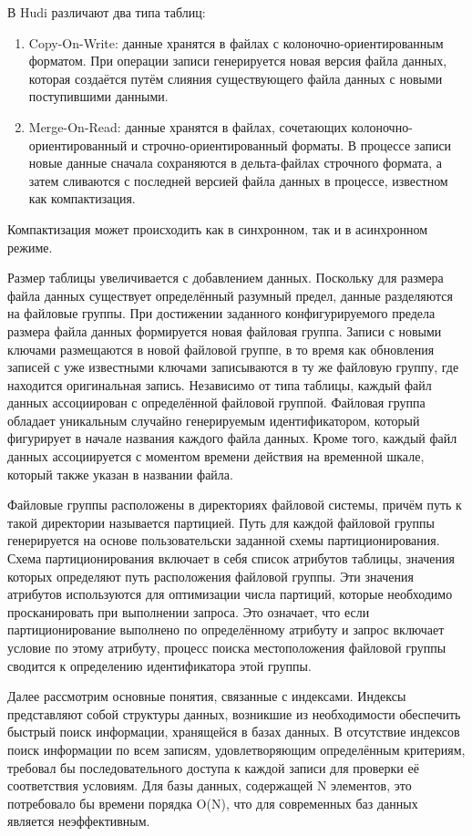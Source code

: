 В Hudi различают два типа таблиц: 
\begin{enumerate}
    \item Copy-On-Write: данные хранятся в файлах с колоночно-ориентированным форматом. При операции записи генерируется новая версия файла данных, которая создаётся путём слияния существующего файла данных с новыми поступившими данными.
    \item Merge-On-Read: данные хранятся в файлах, сочетающих колоночно-ориентированный и строчно-ориентированный форматы. В процессе записи новые данные сначала сохраняются в дельта-файлах строчного формата, а затем сливаются с последней версией файла данных в процессе, известном как компактизация. 
\end{enumerate}
Компактизация может происходить как в синхронном, так и в асинхронном режиме.

Размер таблицы увеличивается с добавлением данных. Поскольку для размера файла данных существует определённый разумный предел, данные разделяются на файловые группы. При достижении заданного конфигурируемого предела размера файла данных формируется новая файловая группа. Записи с новыми ключами размещаются в новой файловой группе, в то время как обновления записей с уже известными ключами записываются в ту же файловую группу, где находится оригинальная запись. Независимо от типа таблицы, каждый файл данных ассоциирован с определённой файловой группой. Файловая группа обладает уникальным случайно генерируемым идентификатором, который фигурирует в начале названия каждого файла данных. Кроме того, каждый файл данных ассоциируется с моментом времени действия на временной шкале, который также указан в названии файла.

Файловые группы расположены в директориях файловой системы, причём путь к такой директории называется партицией. Путь для каждой файловой группы генерируется на основе пользовательски заданной схемы партиционирования. Схема партиционирования включает в себя список атрибутов таблицы, значения которых определяют путь расположения файловой группы. Эти значения атрибутов используются для оптимизации числа партиций, которые необходимо просканировать при выполнении запроса. Это означает, что если партиционирование выполнено по определённому атрибуту и запрос включает условие по этому атрибуту, процесс поиска местоположения файловой группы сводится к определению идентификатора этой группы.

Далее рассмотрим основные понятия, связанные с индексами. Индексы представляют собой структуры данных, возникшие из необходимости обеспечить быстрый поиск информации, хранящейся в базах данных. В отсутствие индексов поиск информации по всем записям, удовлетворяющим определённым критериям, требовал бы последовательного доступа к каждой записи для проверки её соответствия условиям. Для базы данных, содержащей N элементов, это потребовало бы времени порядка O(N), что для современных баз данных является неэффективным.

